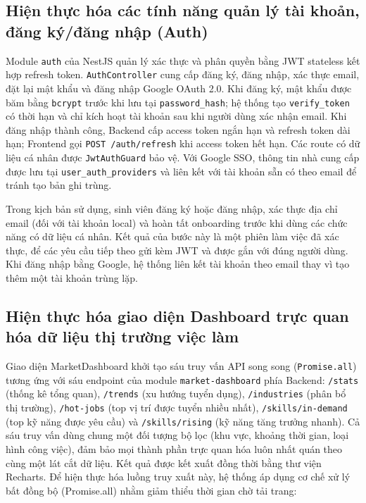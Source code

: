 \subsection{Hiện thực hóa các tính năng quản lý tài khoản, đăng ký/đăng nhập (Auth)}

Module \texttt{auth} của NestJS quản lý xác thực và phân quyền bằng JWT stateless kết hợp refresh token. \texttt{AuthController} cung cấp đăng ký, đăng nhập, xác thực email, đặt lại mật khẩu và đăng nhập Google OAuth 2.0. Khi đăng ký, mật khẩu được băm bằng \texttt{bcrypt} trước khi lưu tại \texttt{password\_hash}; hệ thống tạo \texttt{verify\_token} có thời hạn và chỉ kích hoạt tài khoản sau khi người dùng xác nhận email. Khi đăng nhập thành công, Backend cấp access token ngắn hạn và refresh token dài hạn; Frontend gọi \texttt{POST /auth/refresh} khi access token hết hạn. Các route có dữ liệu cá nhân được \texttt{JwtAuthGuard} bảo vệ. Với Google SSO, thông tin nhà cung cấp được lưu tại \texttt{user\_auth\_providers} và liên kết với tài khoản sẵn có theo email để tránh tạo bản ghi trùng.

Trong kịch bản sử dụng, sinh viên đăng ký hoặc đăng nhập, xác thực địa chỉ email (đối với tài khoản local) và hoàn tất onboarding trước khi dùng các chức năng có dữ liệu cá nhân. Kết quả của bước này là một phiên làm việc đã xác thực, để các yêu cầu tiếp theo gửi kèm JWT và được gắn với đúng người dùng. Khi đăng nhập bằng Google, hệ thống liên kết tài khoản theo email thay vì tạo thêm một tài khoản trùng lặp.

\subsection{Hiện thực hóa giao diện Dashboard trực quan hóa dữ liệu thị trường việc làm}

Giao diện MarketDashboard khởi tạo sáu truy vấn API song song (\texttt{Promise.all}) tương ứng với sáu endpoint của module \texttt{market-dashboard} phía Backend: \texttt{/stats} (thống kê tổng quan), \texttt{/trends} (xu hướng tuyển dụng), \texttt{/industries} (phân bổ thị trường), \texttt{/hot-jobs} (top vị trí được tuyển nhiều nhất), \texttt{/skills/in-demand} (top kỹ năng được yêu cầu) và \texttt{/skills/rising} (kỹ năng tăng trưởng nhanh). Cả sáu truy vấn dùng chung một đối tượng bộ lọc (khu vực, khoảng thời gian, loại hình công việc), đảm bảo mọi thành phần trực quan hóa luôn nhất quán theo cùng một lát cắt dữ liệu. Kết quả được kết xuất đồng thời bằng thư viện Recharts. Để hiện thực hóa luồng truy xuất này, hệ thống áp dụng cơ chế xử lý bất đồng bộ (Promise.all) nhằm giảm thiểu thời gian chờ tải trang:

